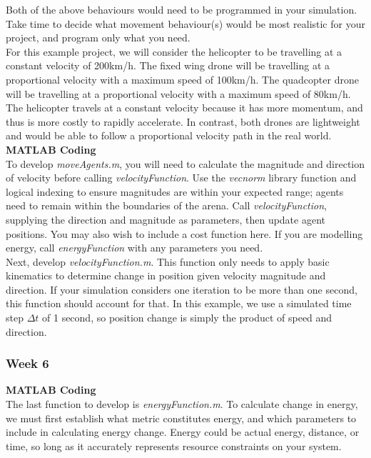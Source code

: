 \documentclass[../CourseManual.tex]{subfiles}
\begin{document}
Both of the above behaviours would need to be programmed in your simulation. Take time to decide what movement behaviour(s) would be most realistic for your project, and program only what you need. \\

For this example project, we will consider the helicopter to be travelling at a constant velocity of 200km/h. The fixed wing drone will be travelling at a proportional velocity with a maximum speed of 100km/h. The quadcopter drone will be travelling at a proportional velocity with a maximum speed of 80km/h. The helicopter travels at a constant velocity because it has more momentum, and thus is more costly to rapidly accelerate. In contrast, both drones are lightweight and would be able to follow a proportional velocity path in the real world. \\

\textbf{MATLAB Coding}\\
To develop \textit{moveAgents.m}, you will need to calculate the magnitude and direction of velocity before calling \textit{velocityFunction}. Use the \textit{vecnorm} library function and logical indexing to ensure magnitudes are within your expected range; agents need to remain within the boundaries of the arena. Call \textit{velocityFunction}, supplying the direction and magnitude as parameters, then update agent positions. You may also wish to include a cost function here.  If you are modelling energy, call \textit{energyFunction} with any parameters you need. \\ 

Next, develop \textit{velocityFunction.m}. This function only needs to apply basic kinematics to determine change in position given velocity magnitude and direction. If your simulation considers one iteration to be more than one second, this function should account for that. In this example, we use a simulated time step $\Delta t$ of 1 second, so position change is simply the product of speed and direction.

\subsubsection{Week 6}
\textbf{MATLAB Coding}\\
The last function to develop is \textit{energyFunction.m}. To calculate change in energy, we must first establish what metric constitutes energy, and which parameters to include in calculating energy change. Energy could be actual energy, distance, or time, so long as it accurately represents resource constraints on your system. \\
\end{document}
